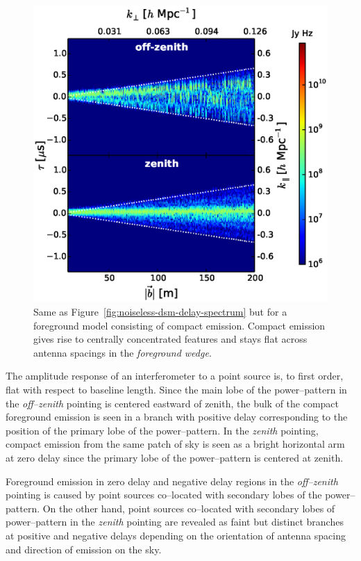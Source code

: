 \documentclass[preprint2,iop,numberedappendix]{emulateapj}
\begin{document}
\begin{figure}[htb]
\centering
\includegraphics[width=\linewidth]{figures/v1_0/delta_array_multi_baseline_CLEAN_noiseless_visibilities_0.3m_ground_custom_gaussian_FG_model_csm_all_sky_nside_64_Tsys_95.0K_185.0_MHz_30.7_MHz_bhw2.0.eps}
\caption{Same as Figure~\ref{fig:noiseless-dsm-delay-spectrum} but for a foreground model consisting of compact emission. Compact emission gives rise to centrally concentrated features and stays flat across antenna spacings in the {\it foreground wedge}.\label{fig:noiseless-csm-delay-spectrum}}
\end{figure}

The amplitude response of an interferometer to a point source is, to first order, flat with respect to baseline length. Since the main lobe of the power--pattern in the {\it off--zenith} pointing is centered eastward of zenith, the bulk of the compact foreground emission is seen in a branch with positive delay corresponding to the position of the primary lobe of the power--pattern. In the {\it zenith} pointing, compact emission from the same patch of sky is seen as a bright horizontal arm at zero delay  since the primary lobe of the power--pattern is centered at zenith. 

Foreground emission in zero delay and negative delay regions in the {\it off--zenith} pointing is caused by point sources co--located with secondary lobes of the power--pattern. On the other hand, point sources co--located with secondary lobes of power--pattern in the {\it zenith} pointing are revealed as faint but distinct branches at positive and negative delays depending on the orientation of antenna spacing and direction of emission on the sky. 
\end{document}
